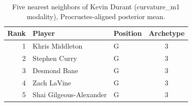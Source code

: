 \begin{table}[htbp]
  \centering\small
  \begin{tabular}{rllc}
    \toprule
    Rank & Player & Position & Archetype \\
    \midrule
    1 & Khris Middleton & G & 3 \\
    2 & Stephen Curry & G & 3 \\
    3 & Desmond Bane & G & 3 \\
    4 & Zach LaVine & G & 3 \\
    5 & Shai Gilgeous-Alexander & G & 3 \\
    \bottomrule
  \end{tabular}
  \caption{Five nearest neighbors of Kevin Durant (curvature_m1 modality), Procrustes-aligned posterior mean.}
  \label{tab:Kevin_Durant_neighbors_curvature_m1}
\end{table}


